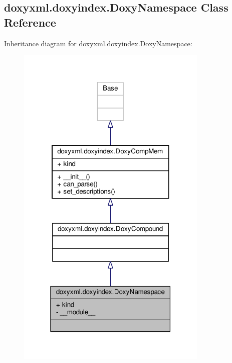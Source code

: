 \subsection{doxyxml.\+doxyindex.\+Doxy\+Namespace Class Reference}
\label{classdoxyxml_1_1doxyindex_1_1DoxyNamespace}


Inheritance diagram for doxyxml.\+doxyindex.\+Doxy\+Namespace\+:
\nopagebreak
\begin{figure}[H]
\begin{center}
\leavevmode
\includegraphics[width=259pt]{d2/d5a/classdoxyxml_1_1doxyindex_1_1DoxyNamespace__inherit__graph}
\end{center}
\end{figure}


